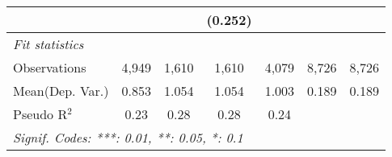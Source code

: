 \begin{tabular}{lcccccc}
                           &            &              & (0.252)      &               &       &   \\   
   \midrule
   \emph{Fit statistics}\\
   Observations            & 4,949      & 1,610        & 1,610        & 4,079         & 8,726 & 8,726\\  
Mean(Dep. Var.) & 0.853 & 1.054 & 1.054 & 1.003 & 0.189 & 0.189 \\
   Pseudo R$^2$            & 0.23       & 0.28         & 0.28         & 0.24          &       & \\  
   \midrule \midrule
   \multicolumn{7}{l}{\emph{Signif. Codes: ***: 0.01, **: 0.05, *: 0.1}}\\
\end{tabular}
\par\endgroup
